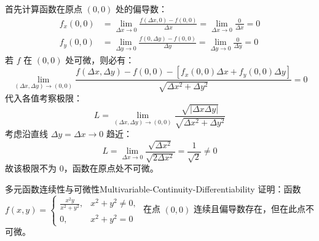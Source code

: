 \begin{myproof}
    首先计算函数在原点 $(0,0)$ 处的偏导数：
    \begin{equation}
        \begin{aligned}
            f_x(0,0) & = \lim_{\Delta x \to 0} \frac{f(\Delta x, 0) - f(0,0)}{\Delta x} = \lim_{\Delta x \to 0} \frac{0}{ \Delta x} = 0 \\
            f_y(0,0) & = \lim_{\Delta y \to 0} \frac{f(0, \Delta y) - f(0,0)}{\Delta y} = \lim_{\Delta y \to 0} \frac{0}{ \Delta y} = 0
        \end{aligned}
    \end{equation}
    若 $f$ 在 $(0,0)$ 处可微，则必有：
    \begin{equation}
        \lim_{(\Delta x, \Delta y) \to (0,0)} \frac{f(\Delta x, \Delta y) - f(0,0) - [f_x(0,0)\Delta x + f_y(0,0)\Delta y]}{\sqrt{\Delta x^2 + \Delta y^2}} = 0
    \end{equation}
    代入各值考察极限：
    \begin{equation}
        L = \lim_{(\Delta x, \Delta y) \to (0,0)} \frac{\sqrt{|\Delta x \Delta y|}}{\sqrt{\Delta x^2 + \Delta y^2}}
    \end{equation}
    考虑沿直线 $\Delta y = \Delta x \to 0$ 趋近：
    \begin{equation}
        L = \lim_{\Delta x \to 0} \frac{\sqrt{\Delta x^2}}{\sqrt{2\Delta x^2}} = \frac{1}{\sqrt{2}} \neq 0
    \end{equation}
    故该极限不为 $0$，函数在原点处不可微。
\end{myproof}


\begin{problem}{多元函数连续性与可微性}{Multivariable-Continuity-Differentiability}
    证明：函数 $f(x, y) = \begin{cases} \frac{x^2 y}{x^2 + y^2}, & x^2 + y^2 \neq 0, \\ 0, & x^2 + y^2 = 0 \end{cases}$ 在点 $(0, 0)$ 连续且偏导数存在，但在此点不可微。
\end{problem}

